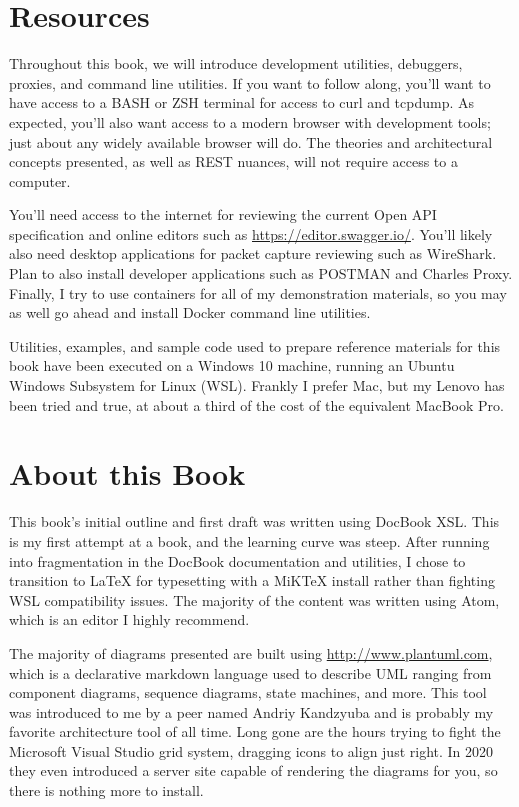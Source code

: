 \section*{Resources}

Throughout this book, we will introduce development utilities, debuggers, proxies, and command line utilities.  If you want to follow along, you'll want to have access to a BASH or ZSH terminal for access to curl and tcpdump.  As expected, you'll also want access to a modern browser with development tools; just about any widely available browser will do.  The theories and architectural concepts presented, as well as REST nuances, will not require access to a computer.

You'll need access to the internet for reviewing the current Open API specification and online editors such as \url{https://editor.swagger.io/}.  You'll likely also need desktop applications for packet capture reviewing such as WireShark.  Plan to also install developer applications such as POSTMAN and Charles Proxy.  Finally, I try to use containers for all of my demonstration materials, so you may as well go ahead and install Docker command line utilities.

Utilities, examples, and sample code used to prepare reference materials for this book have been executed on a Windows 10 machine, running an Ubuntu Windows Subsystem for Linux (WSL).  Frankly I prefer Mac, but my Lenovo has been tried and true, at about a third of the cost of the equivalent MacBook Pro.

\section*{About this Book}
This book's initial outline and first draft was written using DocBook XSL.  This is my first attempt at a book, and the learning curve was steep.  After running into fragmentation in the DocBook documentation and utilities, I chose to transition to LaTeX for typesetting with a MiKTeX install rather than fighting WSL compatibility issues.  The majority of the content was written using Atom, which is an editor I highly recommend.

The majority of diagrams presented are built using \url{http://www.plantuml.com}, which is a declarative markdown language used to describe UML ranging from component diagrams, sequence diagrams, state machines, and more.  This tool was introduced to me by a peer named Andriy Kandzyuba and is probably my favorite architecture tool of all time.  Long gone are the hours trying to fight the Microsoft Visual Studio grid system, dragging icons to align just right.  In 2020 they even introduced a server site capable of rendering the diagrams for you, so there is nothing more to install.

